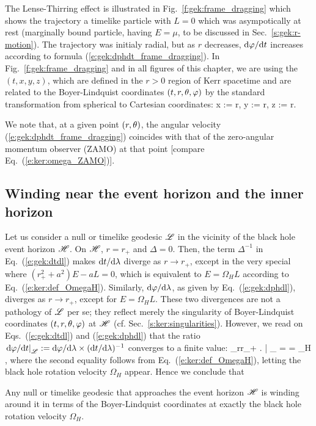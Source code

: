 The Lense-Thirring effect is illustrated in Fig.~\ref{f:gek:frame_dragging}
which shows the trajectory a timelike particle with $L=0$
which was asympotically at rest (marginally bound particle, having $E=\mu$,
to be discussed in Sec.~\ref{s:gek:r-motion}). The trajectory was initialy
radial, but as $r$ decreases, $\mathrm{d}\varphi/\mathrm{d} t$ increases according to formula
(\ref{e:gek:dphdt_frame_dragging}).
In Fig.~\ref{f:gek:frame_dragging} and in all figures of this chapter, we are
using the 
$(t,x,y,z)$, which are
defined in the $r>0$ region of Kerr spacetime and are related to the
Boyer-Lindquist coordinates $(t,r,\theta,\varphi)$ by the standard transformation
from spherical to Cartesian coordinates:
\be \label{e:gek:Cartesian_BL}
    x := r\sin\th\cos\ph,\qquad
    y := r\sin\th\sin\ph,\qquad
    z := r\cos\th .
\ee

We note that, at a given point $(r,\theta)$, the angular velocity (\ref{e:gek:dphdt_frame_dragging})
coincides with that of the zero-angular momentum observer (ZAMO) at that point
[compare Eq.~(\ref{e:ker:omega_ZAMO})].

\subsection{Winding near the event horizon and the inner horizon}

Let us consider a null or timelike geodesic $\mathscr{L}$ in the vicinity of the
black hole event horizon $\mathscr{H}$.
On $\mathscr{H}$, $r=r_+$ and $\Delta = 0$. Then, the term
$\Delta^{-1}$ in Eq.~(\ref{e:gek:dtdl}) makes $\mathrm{d} t/\mathrm{d}\lambda$ diverge as
$r\to r_+$, except in the very special where $(r_+^2 + a^2)E - aL = 0$, which
is equivalent to $E = \Omega_H L$ according to Eq.~(\ref{e:ker:def_OmegaH}).
Similarly, $\mathrm{d}\varphi/\mathrm{d}\lambda$, as given by Eq.~(\ref{e:gek:dphdl}), diverges
as $r\to r_+$, except for $E = \Omega_H L$. These two divergences are not
a pathology of $\mathscr{L}$ per se; they
reflect merely the singularity of Boyer-Lindquist coordinates $(t,r,\theta,\varphi)$ at $\mathscr{H}$
(cf.  Sec.~\ref{s:ker:singularities}). However, we read on Eqs.~(\ref{e:gek:dtdl}) and
(\ref{e:gek:dphdl}) that the ratio
$\left. \mathrm{d}\varphi/\mathrm{d} t \right| _{\mathscr{L}} := \mathrm{d}\varphi/\mathrm{d}\lambda \times (\mathrm{d} t/\mathrm{d}\lambda)^{-1}$
converges to a finite value:
\be \label{e:gek:lim_dphdt_Hor}
    \lim_{r\to r_+} \left.  \right| _{\Li} =  = \Omega_H ,
\ee
where the second equality follows from Eq.~(\ref{e:ker:def_OmegaH}), letting
the black hole rotation velocity $\Omega_H$ appear.
Hence we conclude that
\begin{greybox}
Any null or timelike geodesic that approaches the event horizon $\mathscr{H}$
is winding around it in terms of the Boyer-Lindquist coordinates at exactly the black hole rotation velocity $\Omega_H$.
\end{greybox}

